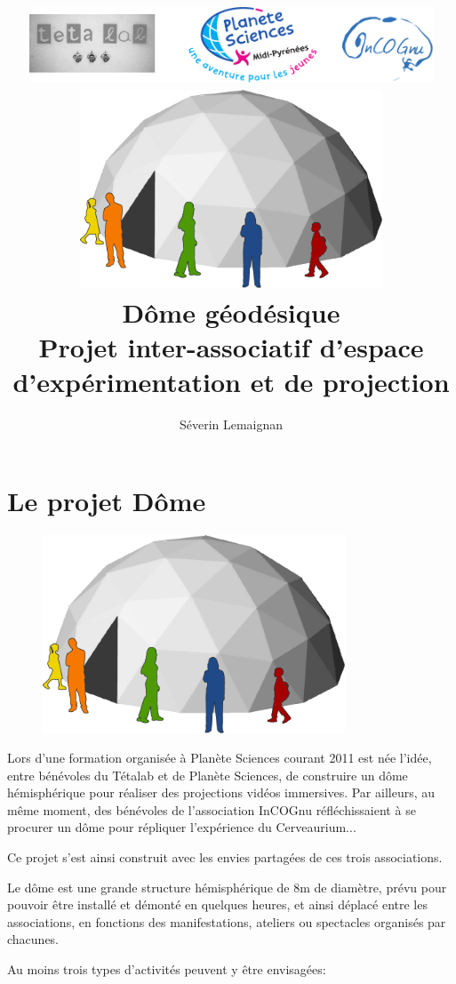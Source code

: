 \documentclass[a4paper,12pt]{report}
\title{
	\includegraphics[width=12cm]{logos.pdf}\\
	\vfill
	\includegraphics[width=9cm]{general.pdf}\\
	\vspace{3em}
	\LARGE{\textbf{Dôme géodésique}}\\[1cm]
	\large{Projet inter-associatif d'espace d'expérimentation et de projection}\\[1cm]
	\vfill
}
\author{
Séverin Lemaignan
}
\begin{document}

\maketitle

\tableofcontents


\chapter{Le projet Dôme}

\begin{figure}[!h]
\centering
\includegraphics[width=9cm]{general.pdf}
\end{figure}


Lors d'une formation organisée à Planète Sciences courant 2011 est née l'idée,
entre bénévoles du Tétalab et de Planète Sciences, de construire un dôme
hémisphérique pour réaliser des projections vidéos immersives. Par ailleurs, au
même moment, des bénévoles de l'association InCOGnu réfléchissaient à se
procurer un dôme pour répliquer l'expérience du Cerveaurium...

Ce projet s'est ainsi construit avec les envies partagées de ces trois
associations.

Le dôme est une grande structure hémisphérique de 8m de diamètre, prévu pour
pouvoir être installé et démonté en quelques heures, et ainsi déplacé entre les
associations, en fonctions des manifestations, ateliers ou spectacles organisés
par chacunes.

Au moins trois types d'activités peuvent y être envisagées:
\end{document}
